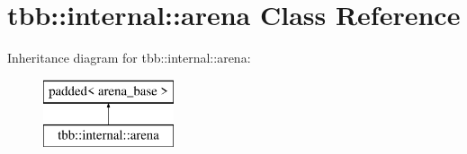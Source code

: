 \hypertarget{classtbb_1_1internal_1_1arena}{}\section{tbb\+:\+:internal\+:\+:arena Class Reference}
\label{classtbb_1_1internal_1_1arena}
Inheritance diagram for tbb\+:\+:internal\+:\+:arena\+:\begin{figure}[H]
\begin{center}
\leavevmode
\includegraphics[height=2.000000cm]{classtbb_1_1internal_1_1arena}
\end{center}
\end{figure}
